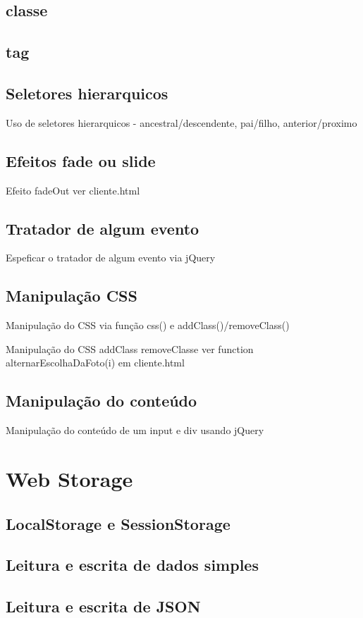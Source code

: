 \subsection{classe}


\subsection{tag}



\subsection{Seletores hierarquicos}
Uso de seletores hierarquicos - ancestral/descendente, pai/filho, anterior/proximo
\subsection{Efeitos fade ou slide}

Efeito fadeOut ver cliente.html


\subsection{Tratador de algum evento}
Espeficar o tratador de algum evento via jQuery
\subsection{Manipulação CSS}
Manipulação do CSS via função css() e addClass()/removeClass()

Manipulação do CSS addClass removeClasse ver function alternarEscolhaDaFoto(i) em cliente.html


\subsection{Manipulação do conteúdo}
Manipulação do conteúdo de um input e div usando jQuery

\section{Web Storage }
\subsection{LocalStorage e SessionStorage}
\subsection{Leitura e escrita de dados simples}
\subsection{Leitura e escrita de JSON}
